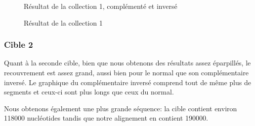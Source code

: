 \begin{figure}[!ht]
\begin{minipage}[c]{.46 \linewidth}
\begin{center}
			Résultat de la collection 1, complémenté et inversé
		\end{center}
	\end{minipage}
	\caption{Résultat de la collection 1}
\end{figure}

\FloatBarrier

\subsubsection*{Cible 2}

Quant à la seconde cible, bien que nous obtenons des résultats assez éparpillés,
le recouvrement est assez grand, aussi bien pour le normal que son
complémentaire inversé.
Le graphique du complémentaire inversé comprend tout de même plus de segments et
ceux-ci sont plus longs que ceux du normal.

Nous obtenons également une plus grande séquence: la cible contient environ
118000 nucléotides tandis que notre alignement en contient 190000.

